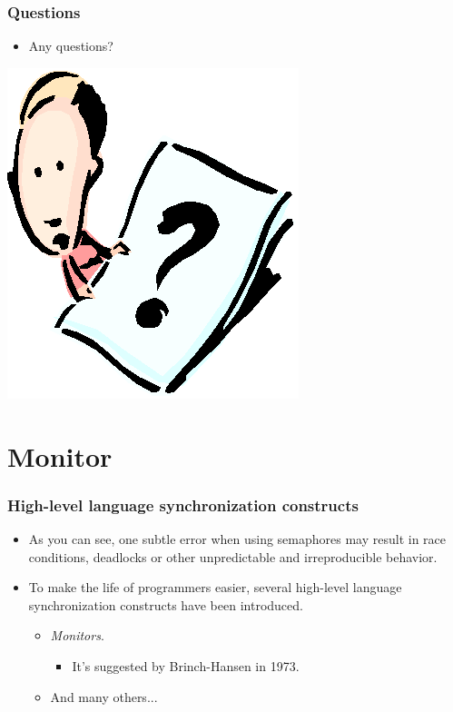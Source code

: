 \documentclass[CJKutf8,xcolor=pdftex,dvipsnames,table]{beamer}
\begin{document}
\begin{CJK*}{UTF8}{song}
  \begin{frame}
  \frametitle{Questions}
  \begin{itemize}
  \item{Any questions?}
  \end{itemize}
  \begin{center}
    \includegraphics[scale=.5]{question}
  \end{center}
  \end{frame}

\fi

\section{Monitor}

  \begin{frame}
  \frametitle{High-level language synchronization constructs} \pause
  \begin{itemize}
  \item{As you can see, one subtle error when using semaphores may result in race conditions, deadlocks or other unpredictable and irreproducible behavior.} \pause
  \item{To make the life of programmers easier, several high-level language synchronization constructs have been introduced.} \pause
    \begin{itemize}
   \item{\emph{Monitors}.} \pause
      \begin{itemize}
      \item{It's suggested by Brinch-Hansen in 1973.} \pause
      \end{itemize}
    \item{And many others...}
    \end{itemize}
  \end{itemize}
  \end{frame}



\end{CJK*}
\end{document}
